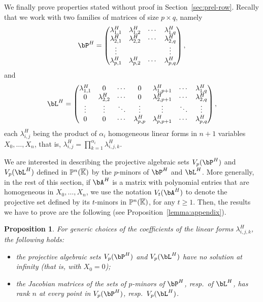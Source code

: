 \documentclass[12pt]{article}
\newtheorem*{propositionnonumber}{Proposition}
\begin{document}
We finally prove properties stated without proof in
Section~\ref{sec:prel-row}.  Recally that we work with two families of
matrices of size $p \times q$, namely
\begin{align}\label{eqdef:type2b}
\bP^H= \left( \begin{matrix}
\lambda^H_{1,1} & \lambda^H_{1,2} & \cdots & \lambda^H_{1, q}\\
 \lambda^H_{2,1} &  \lambda^H_{2,2} & \cdots & \lambda^H_{2, q}\\
 \vdots & & & \vdots\\
 \lambda^H_{p,1} &  \lambda^H_{p,2}& \cdots & \lambda^H_{p, q}
\end{matrix} \right),
\end{align}
and
\begin{align}\label{eqdef:type1b}
\bL^H= \left( \begin{matrix}
\lambda^H_{1,1} & 0 & \cdots & 0 & \lambda^H_{1,p+1} & \cdots & \lambda^H_{1, q}\\
0 & \lambda^H_{2,2} & \cdots & 0 & \lambda^H_{2,p+1} & \cdots & \lambda^H_{2, q}\\
\vdots & \vdots & \ddots & \vdots & \vdots & \ddots & \vdots\\
0 & 0 & \cdots & \lambda^H_{p,p} & \lambda^H_{p,p+1} & \cdots & \lambda^H_{p, q}
\end{matrix} \right),
\end{align}
each $\lambda^H_{i,j}$ being the product of $\alpha_i$ homogeneous
linear forms in $n+1$ variables $X_0,\dots,X_n$, that is,
$\lambda^H_{i,j}=\prod_{k=1}^{\alpha_i} \lambda^H_{i,j,k}$.

We are interested in describing the projective algebraic sets
$V_p(\bP^H)$ and $V_p(\bL^H)$ defined in $\mathbb{P}^n(\overline{\mathbb{K}})$ by the
$p$-minors of $\bP^H$ and $\bL^H$. More generally, in the rest of this
section, if $\bA^H$ is a matrix with polynomial entries that are
homogeneous in $X_0,\dots,X_n$, we use the notation $V_t(\bA^H)$ to
denote the projective set defined by its $t$-minors in $\mathbb{P}^n(\overline{\mathbb{K}})$,
for any $t\ge 1$. Then, the results we have to prove are the following
(see Proposition~\ref{lemma:appendix}).
\begin{propositionnonumber}\label{lemma:appendix2}
  For generic choices of the coefficients of the linear forms
  $\lambda^H_{i,j,k}$, the following holds:
  \begin{itemize}
  \item the projective algebraic sets $V_p(\bP^H)$ and $V_p(\bL^H)$
    have no solution at infinity (that is, with $X_0=0$);
  \item the Jacobian matrices of the sets of $p$-minors 
    of $\bP^H$, resp.\ of $\bL^H$, has rank $n$ at every point 
    in $V_p(\bP^H)$, resp.\ $V_p(\bL^H)$.
\end{itemize}
\end{propositionnonumber}
\end{document}
